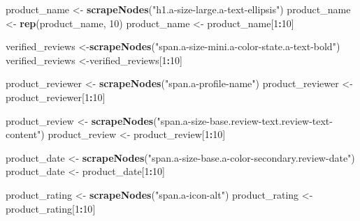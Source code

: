 \documentclass[
]{article}
\newenvironment{Shaded}{\begin{snugshade}}{\end{snugshade}}
\newcommand{\DecValTok}[1]{\textcolor[rgb]{0.00,0.00,0.81}{#1}}
\newcommand{\FunctionTok}[1]{\textcolor[rgb]{0.13,0.29,0.53}{\textbf{#1}}}
\newcommand{\NormalTok}[1]{#1}
\newcommand{\OtherTok}[1]{\textcolor[rgb]{0.56,0.35,0.01}{#1}}
\newcommand{\SpecialCharTok}[1]{\textcolor[rgb]{0.81,0.36,0.00}{\textbf{#1}}}
\newcommand{\StringTok}[1]{\textcolor[rgb]{0.31,0.60,0.02}{#1}}
\begin{document}
\begin{Shaded}
\begin{Highlighting}[]
\NormalTok{  product\_name }\OtherTok{\textless{}{-}} \FunctionTok{scrapeNodes}\NormalTok{(}\StringTok{"h1.a{-}size{-}large.a{-}text{-}ellipsis"}\NormalTok{)}
\NormalTok{  product\_name }\OtherTok{\textless{}{-}} \FunctionTok{rep}\NormalTok{(product\_name, }\DecValTok{10}\NormalTok{)}
\NormalTok{  product\_name }\OtherTok{\textless{}{-}}\NormalTok{ product\_name[}\DecValTok{1}\SpecialCharTok{:}\DecValTok{10}\NormalTok{]}
  
\NormalTok{  verified\_reviews }\OtherTok{\textless{}{-}}\FunctionTok{scrapeNodes}\NormalTok{(}\StringTok{"span.a{-}size{-}mini.a{-}color{-}state.a{-}text{-}bold"}\NormalTok{)}
\NormalTok{  verified\_reviews }\OtherTok{\textless{}{-}}\NormalTok{verified\_reviews[}\DecValTok{1}\SpecialCharTok{:}\DecValTok{10}\NormalTok{]}
  
\NormalTok{  product\_reviewer }\OtherTok{\textless{}{-}} \FunctionTok{scrapeNodes}\NormalTok{(}\StringTok{"span.a{-}profile{-}name"}\NormalTok{)}
\NormalTok{  product\_reviewer }\OtherTok{\textless{}{-}}\NormalTok{ product\_reviewer[}\DecValTok{1}\SpecialCharTok{:}\DecValTok{10}\NormalTok{]}
  
\NormalTok{  product\_review }\OtherTok{\textless{}{-}} \FunctionTok{scrapeNodes}\NormalTok{(}\StringTok{"span.a{-}size{-}base.review{-}text.review{-}text{-}content"}\NormalTok{)}
\NormalTok{  product\_review }\OtherTok{\textless{}{-}}\NormalTok{ product\_review[}\DecValTok{1}\SpecialCharTok{:}\DecValTok{10}\NormalTok{]}
  
\NormalTok{  product\_date }\OtherTok{\textless{}{-}} \FunctionTok{scrapeNodes}\NormalTok{(}\StringTok{"span.a{-}size{-}base.a{-}color{-}secondary.review{-}date"}\NormalTok{)}
\NormalTok{  product\_date }\OtherTok{\textless{}{-}}\NormalTok{ product\_date[}\DecValTok{1}\SpecialCharTok{:}\DecValTok{10}\NormalTok{]}
  
\NormalTok{  product\_rating }\OtherTok{\textless{}{-}} \FunctionTok{scrapeNodes}\NormalTok{(}\StringTok{"span.a{-}icon{-}alt"}\NormalTok{)}
\NormalTok{  product\_rating }\OtherTok{\textless{}{-}}\NormalTok{ product\_rating[}\DecValTok{1}\SpecialCharTok{:}\DecValTok{10}\NormalTok{]}
  

\end{Highlighting}
\end{Shaded}
\end{document}
